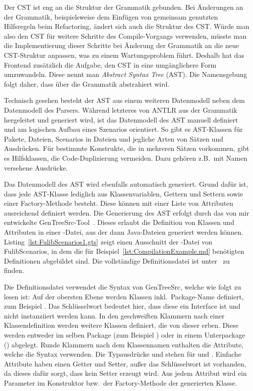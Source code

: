 Der CST ist eng an die Struktur der Grammatik gebunden.
Bei Änderungen an der Grammatik, beispielsweise dem Einfügen von gemeinsam genutzten Hilfsregeln beim Refactoring, ändert sich auch die Struktur des CST\@.
Würde man also den CST für weitere Schritte des Compile-Vorgangs verwenden, müsste man die Implementierung dieser Schritte bei Änderung der Grammatik an die neue CST-Struktur anpassen, was zu einem Wartungsproblem führt.
Deshalb hat das Frontend zusätzlich die Aufgabe, den CST in eine umgänglichere Form umzuwandeln.
Diese nennt man \emph{Abstract Syntax Tree} (AST).
Die Namensgebung folgt daher, dass über die Grammatik abstrahiert wird.

Technisch gesehen besteht der AST aus einem weiteren Datenmodell neben dem Datenmodell des Parsers.
Während letzteres von ANTLR aus der Grammatik hergeleitet und generiert wird, ist das Datenmodell des AST manuell definiert und am logischen Aufbau eines Szenarios orientiert.
So gibt es AST-Klassen für Pakete, Dateien, Scenarios in Dateien und jegliche Arten von Sätzen und Ausdrücken.
Für bestimmte Konstrukte, die in mehreren Sätzen vorkommen, gibt es Hilfsklassen, die Code-Duplizierung vermeiden.
Dazu gehören z.B.\ mit Namen versehene Ausdrücke.

Das Datenmodell des AST wird ebenfalls automatisch generiert.
Grund dafür ist, dass jede AST-Klasse lediglich aus Klassenvariablen, Gettern und Settern sowie einer Factory-Methode besteht.
Diese können mit einer Liste von Attributen ausreichend definiert werden.
Die Generierung des AST erfolgt durch das von mir entwickelte GenTreeSrc-Tool~\cite{gentreesrc}.
Dieses erlaubt die Definition von Klassen und Attributen in einer -Datei, aus der dann Java-Dateien generiert werden können.
Listing~\ref{lst:FulibScenarios1.gts} zeigt einen Ausschnitt der -Datei von FulibScenarios, in dem die für Beispiel~\ref{lst:CompilationExample.md} benötigten Definitionen abgebildet sind.
Die vollständige Definitionsdatei ist unter~\cite{gts-definitions} zu finden.


Die Definitionsdatei verwendet die Syntax von GenTreeSrc, welche wie folgt zu lesen ist:
Auf der obersten Ebene werden Klassen inkl.\ Package-Name definiert, zum Beispiel .
Das Schlüsselwort  bedeutet hier, dass diese ein Interface ist und nicht instanziiert werden kann.
In den geschweiften Klammern nach einer Klassendefinition werden weitere Klassen definiert, die von dieser erben.
Diese werden entweder im selben Package (zum Beispiel ) oder in einem Unterpackage () abgelegt.
Runde Klammern nach dem Klassennamen enthalten die Attribute, welche die Syntax  verwenden.
Die Typausdrücke \code{[T]} und \code{[T:U]} stehen für  und .
Einfache Attribute haben einen Getter und Setter, außer das Schlüsselwort  ist vorhanden, da dieses dafür sorgt, dass kein Setter erzeugt wird.
Aus jedem Attribut wird ein Parameter im Konstruktor bzw.\ der Factory-Methode der generierten Klasse.

